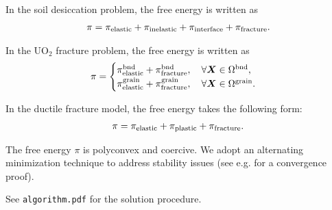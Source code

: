 \begin{frame}{}
In the soil desiccation problem, the free energy is written as
\begin{align}
    \pi = \pi_{\text{elastic}} + \pi_{\text{inelastic}} + \pi_{\text{interface}} + \pi_{\text{fracture}}.
\end{align}

In the UO$_2$ fracture problem, the free energy is written as
\begin{align}
    \pi =
    \begin{cases}
        \pi_{\text{elastic}}^\text{bnd} + \pi_{\text{fracture}}^\text{bnd}, \quad \forall \boldsymbol{X} \in \Omega^\text{bnd}, \\
        \pi_{\text{elastic}}^\text{grain} + \pi_{\text{fracture}}^\text{grain}, \quad \forall \boldsymbol{X} \in \Omega^\text{grain}.
    \end{cases}
\end{align}

In the ductile fracture model, the free energy takes the following form:
\begin{align}
    \pi = \pi_{\text{elastic}} + \pi_{\text{plastic}} + \pi_{\text{fracture}}.
\end{align}

The free energy $\pi$ is polyconvex and coercive. We adopt an alternating minimization technique to address stability issues (see e.g. \cite{hong2017linear} for a convergence proof). \\
\bigskip
\begin{exampleblock}{}
    See \texttt{algorithm.pdf} for the solution procedure.
\end{exampleblock}
\end{frame}


